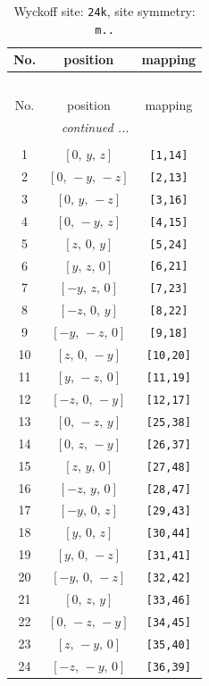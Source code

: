 \documentclass[fleqn,8pt]{jsarticle}
\begin{document}
\begin{longtable}{ccc}
\caption{Wyckoff site: {\tt 24k}, site symmetry: {\tt m..}}
 \\
 \hline \hline
No. & position & mapping \\ \hline \endfirsthead

\multicolumn{2}{l}{\tablename\ \thetable{}} \\
 \hline \hline
No. & position & mapping \\ \hline \endhead

 \hline \hline
\multicolumn{2}{r}{\footnotesize\it continued ...} \\ \endfoot

 \hline \hline
\multicolumn{2}{r}{} \\ \endlastfoot

1 & $\left[ 0,\, y,\, z \right]$ & {\tt [1,14]} \\ \hline
2 & $\left[ 0,\, - y,\, - z \right]$ & {\tt [2,13]} \\ \hline
3 & $\left[ 0,\, y,\, - z \right]$ & {\tt [3,16]} \\ \hline
4 & $\left[ 0,\, - y,\, z \right]$ & {\tt [4,15]} \\ \hline
5 & $\left[ z,\, 0,\, y \right]$ & {\tt [5,24]} \\ \hline
6 & $\left[ y,\, z,\, 0 \right]$ & {\tt [6,21]} \\ \hline
7 & $\left[ - y,\, z,\, 0 \right]$ & {\tt [7,23]} \\ \hline
8 & $\left[ - z,\, 0,\, y \right]$ & {\tt [8,22]} \\ \hline
9 & $\left[ - y,\, - z,\, 0 \right]$ & {\tt [9,18]} \\ \hline
10 & $\left[ z,\, 0,\, - y \right]$ & {\tt [10,20]} \\ \hline
11 & $\left[ y,\, - z,\, 0 \right]$ & {\tt [11,19]} \\ \hline
12 & $\left[ - z,\, 0,\, - y \right]$ & {\tt [12,17]} \\ \hline
13 & $\left[ 0,\, - z,\, y \right]$ & {\tt [25,38]} \\ \hline
14 & $\left[ 0,\, z,\, - y \right]$ & {\tt [26,37]} \\ \hline
15 & $\left[ z,\, y,\, 0 \right]$ & {\tt [27,48]} \\ \hline
16 & $\left[ - z,\, y,\, 0 \right]$ & {\tt [28,47]} \\ \hline
17 & $\left[ - y,\, 0,\, z \right]$ & {\tt [29,43]} \\ \hline
18 & $\left[ y,\, 0,\, z \right]$ & {\tt [30,44]} \\ \hline
19 & $\left[ y,\, 0,\, - z \right]$ & {\tt [31,41]} \\ \hline
20 & $\left[ - y,\, 0,\, - z \right]$ & {\tt [32,42]} \\ \hline
21 & $\left[ 0,\, z,\, y \right]$ & {\tt [33,46]} \\ \hline
22 & $\left[ 0,\, - z,\, - y \right]$ & {\tt [34,45]} \\ \hline
23 & $\left[ z,\, - y,\, 0 \right]$ & {\tt [35,40]} \\ \hline
24 & $\left[ - z,\, - y,\, 0 \right]$ & {\tt [36,39]} \\
\end{longtable}
\end{document}
